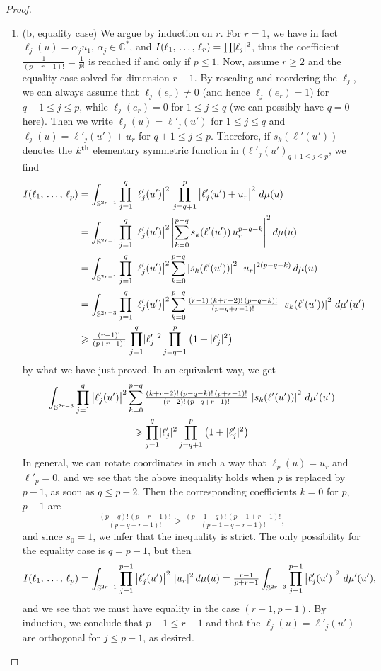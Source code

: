 \documentclass[AHL,Unicode,longabstracts,published]{cedram}
\DeclarePairedDelimiter{\abs}{\lvert}{\rvert}
\newcommand*\bC{\mathbb{C}}
\newcommand*\bS{\mathbb{S}}
\let\leq\leqslant
\let\geq\geqslant
\begin{document}
\begin{proof}
\begin{enumerate}
\item (b, equality case) We argue by induction on $r$. For $r=1$, we have in fact $\ell_j(u)=\alpha_ju_1$, $\alpha_j\in\bC^*$, and
$I(\ell_1,\,\dotsc,\,\ell_r)=\prod\abs{\ell_j}^2$, thus the coefficient $\tfrac{1}{ (p+r-1)!}=\tfrac{1}{ p!}$ is reached if and only if $p\leq 1$. Now, assume $r\geq 2$ and the equality case solved for dimension $r-1$. By rescaling and reordering the $\ell_j$, we can always assume that $\ell_j(e_r)\ne 0$ (and hence
$\ell_j(e_r)=1$) for $q+1\leq j\leq p$, while $\ell_j(e_r)=0$ for
$1\leq j\leq q$ (we can possibly have $q=0$ here). Then we write
$\ell_j(u)=\ell'_j(u')$ for $1\leq j\leq q$ and
$\ell_j(u)=\ell'_j(u')+u_r$ for $q+1\leq j\leq p$. Therefore, if
$s_k(\ell'(u'))$ denotes the $k^{\rm th}$ elementary symmetric function in
$(\ell'_j(u')_{q+1\leq j\leq p}$, we find
\begin{align*}
I(\ell_1,\,\dotsc,\,\ell_p) &=\int_{\bS^{2r-1}}\prod_{j=1}^q\left|\ell'_j(u')\right|^2\,
\prod_{j=q+1}^p\left|\ell'_j(u')+u_r\right|^2\,d\mu(u)\\
&=\int_{\bS^{2r-1}}\prod_{j=1}^q\left|\ell'_j(u')\right|^2
\left|\sum_{k=0}^{p-q}s_k(\ell'(u'))\,u_r^{p-q-k}\right|^2 d\mu(u)
\\
&=\int_{\bS^{2r-1}}\prod_{j=1}^q\left|\ell'_j(u')\right|^2
\sum_{k=0}^{p-q}
\left|s_k(\ell'(u'))\right|^2\,\abs{u_r}^{2(p-q-k)}\,d\mu(u)\\
&=\int_{\bS^{2r-3}}\prod_{j=1}^q\left|\ell'_j(u')\right|^2
\sum_{k=0}^{p-q}\tfrac{(r-1)\,(k+r-2)!\,(p-q-k)!}{(p-q+r-1)!}\,
\left|s_k(\ell'(u'))\right|^2\,d\mu'(u')\\
&\geq\tfrac{(r-1)!}{(p+r-1)!}\,\prod_{j=1}^q\abs{\ell'_j}^2
\prod_{j=q+1}^p\left(1+\abs{\ell'_j}^2\right)
\end{align*}
by what we have just proved. In an equivalent way, we get
\begin{multline*}
\int_{\bS^{2r-3}}\prod_{j=1}^q\left|\ell'_j(u')\right|^2
\sum_{k=0}^{p-q}\tfrac{(k+r-2)!\,(p-q-k)!\,(p+r-1)!}{(r-2)!\,(p-q+r-1)!}\,
\left|s_k(\ell'(u'))\right|^2\,d\mu'(u')
\\
\geq\prod_{j=1}^q\abs{\ell'_j}^2
\prod_{j=q+1}^p\left(1+\abs{\ell'_j}^2\right)
\end{multline*}
In general, we can rotate coordinates in such a way that $\ell_p(u)=u_r$ and $\ell'_p=0$, and we see that the above inequality holds when $p$ is replaced by $p-1$, as soon as $q\leq p-2$. Then the corresponding coefficients $k=0$ for $p$, $p-1$ are
\[
\tfrac{(p-q)!\,(p+r-1)!}{(p-q+r-1)!}>\tfrac{(p-1-q)!\,(p-1+r-1)!}{(p-1-q+r-1)!},
\]
and since $s_0=1$, we infer that the inequality is strict. The only possibility for the equality case is $q=p-1$, but then
\[
I(\ell_1,\,\dotsc,\,\ell_p)=
\int_{\bS^{2r-1}}\prod_{j=1}^{p-1}\left|\ell'_j(u')\right|^2\,\abs{u_r}^2\,d\mu(u)=
\tfrac{r-1}{ p+r-1}\int_{\bS^{2r-3}}\prod_{j=1}^{p-1}\left|\ell'_j(u')\right|^2\,d\mu'(u'),
\]
and we see that we must have equality in the case $(r-1,p-1)$. By induction, we conclude that $p-1\leq r-1$ and that the
$\ell_j(u)=\ell'_j(u')$ are orthogonal for $j\leq p-1$, as desired.\qedhere
\end{enumerate}
\end{proof}
\end{document}
